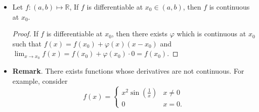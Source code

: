 \documentclass{article}
\newcommand{\R}{\mathbb{R}}
\newcommand{\?}{\stackrel{?}{=}}
\theoremstyle{definition} %
\begin{document}
\begin{itemize}
\begin{proof}
\begin{align*}
            &\rightarrow f'(x_0) = \varphi(x_0).
        \end{align*}
        Next, suppose $f'(x_0)$ is well-defined. In particular, set
        \[
        \varphi = \begin{cases}
            \frac{f(x) - f(x_0)}{x - x_0} & x \neq x_0 \\
            f'(x_0) & x = x_0.
        \end{cases}
        \]
        Clearly, $\varphi(x)$ is continuous at $x_0$, so
        $$\lim_{x \to x_0} \varphi(x) = \lim_{x \to x_0} \frac{f(x) - f(x_0)}{x - x_0} = f'(x_0) = \varphi(x_0).$$
        On the other hand, when $x \neq x_0$, we have
        \begin{alignat*}{2}
            && \varphi(x) &= \frac{f(x) - f(x_0)}{x - x_0} \\
            \iff&& f(x) &= f(x_0) + \varphi(x_0)(x - x_0) \\
            \iff&& f(x) &= f(x_0) + \varphi(x)(x - x_0).
        \end{alignat*}
    \end{proof}
    \item[]
    \begin{lemma}
        Let $f: (a, b) \mapsto \R$, If $f$ is differentiable at $x_0 \in (a, b)$, then $f$ is continuous at $x_0$.
    \end{lemma}
    \begin{proof}
        If $f$ is differentiable at $x_0$, then there exists $\varphi$ which is continuous at $x_0$ such that $f(x) = f(x_0) + \varphi(x)(x - x_0)$ and $\lim_{x \to x_0} f(x) = f(x_0) + \varphi(x_0) \cdot 0 = f(x_0)$.
    \end{proof}
    \item \textbf{Remark}. There exists functions whose derivatives are not continuous. For example, consider
    \[
    f(x) =
    \begin{cases}
        x^2 \sin\left(\frac{1}{x}\right) & x \neq 0 \\
        0 & x = 0.
    \end{cases}
    \]
\end{itemize}

\newpage

\listoftheorems[]
\end{document}

